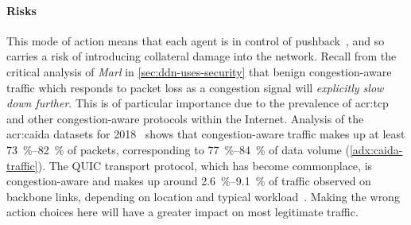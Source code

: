 \paragraph{Risks}
This mode of action means that each agent is in control of pushback~\parencite{DBLP:journals/ccr/MahajanBFIPS02a}, and so carries a risk of introducing collateral damage into the network.
Recall from the critical analysis of \emph{Marl} in \cref{sec:ddn-uses-security} that benign congestion-aware traffic which responds to packet loss as a congestion signal will \emph{explicitly slow down further}.
This is of particular importance due to the prevalence of \gls{acr:tcp} and other congestion-aware protocols within the Internet.
Analysis of the \gls{acr:caida} datasets for 2018~\parencite{caida-2018-passive} shows that congestion-aware traffic makes up at least \qtyrange{73}{82}{\percent} of packets, corresponding to \qtyrange{77}{84}{\percent} of data volume (\cref{adx:caida-traffic}).
The QUIC transport protocol, which has become commonplace, is congestion-aware and makes up around \qtyrange{2.6}{9.1}{\percent} of traffic observed on backbone links, depending on location and typical workload~\parencite{DBLP:conf/pam/RuthPDH18}.
Making the wrong action choices here will have a greater impact on most legitimate traffic.

